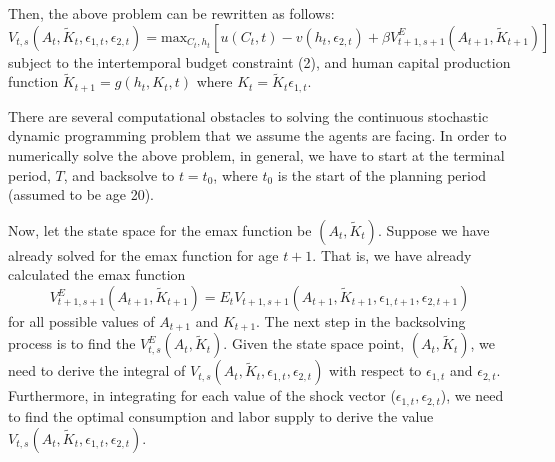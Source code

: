 \documentclass{article}
\begin{document}
Then, the above problem can be rewritten as follows:
\begin{equation*}
V_{t,s}(A_t, \tilde{K}_t,\epsilon_{1,t},\epsilon_{2,t}) = \text{max}_{C_t, h_t} [u(C_t,t) - v(h_t, \epsilon_{2,t}) + \beta V^E_{t+1,s+1} (A_{t+1},\tilde{K}_{t+1})]
\end{equation*}
subject to the intertemporal budget constraint (2), and human capital production function $\tilde{K}_{t+1}=g(h_t,K_t,t)$ where $K_t=\tilde{K}_t \epsilon_{1,t}$.\par
There are several computational obstacles to solving the continuous stochastic dynamic programming problem that we assume the agents are facing. In order to numerically solve the above problem, in general, we have to start at the terminal period, $T$, and backsolve to $t = t_0$, where $t_0$ is the start of the planning period (assumed to be age 20).\par
Now, let the state space for the emax function be $(A_t, \tilde{K}_t)$. Suppose we have already solved for the emax function for age $t + 1$. That is, we have already calculated the emax function
\begin{equation*}
V^E_{t+1,s+1}(A_{t+1},\tilde{K}_{t+1}) = E_t V_{t+1,s+1}(A_{t+1},\tilde{K}_{t+1},\epsilon_{1,t+1},\epsilon_{2,t+1}) 
\end{equation*}
for all possible values of $A_{t+1}$ and $K_{t+1}$. The next step in the backsolving process is to find the $V^E_{t,s} (A_t,\tilde{K}_t)$. Given the state space point, $(A_t, \tilde{K}_t)$, we need to derive the integral of $V_{t,s}(A_t, \tilde{K}_t, \epsilon_{1,t},\epsilon_{2,t})$ with respect to $\epsilon_{1,t}$ and $\epsilon_{2,t}$. Furthermore, in integrating for each value of the shock vector ($\epsilon_{1,t},\epsilon_{2,t}$), we need to find the optimal consumption and labor supply to derive the value $V_{t,s}(A_t, \tilde{K}_t, \epsilon_{1,t},\epsilon_{2,t})$. \par
\end{document}
